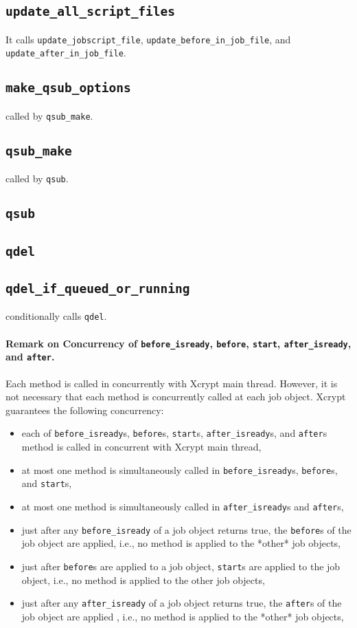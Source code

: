 \documentclass[a4paper,10pt]{report}
\def\|{\verb|} %|
\begin{document}
\subsection{\texttt{update\_all\_script\_files}}
It calls \|update_jobscript_file|, \|update_before_in_job_file|, and \|update_after_in_job_file|.
%
\subsection{\texttt{make\_qsub\_options}}
called by \|qsub_make|.
%
\subsection{\texttt{qsub\_make}}
called by \|qsub|.
%
\subsection{\texttt{qsub}}
%
\subsection{\texttt{qdel}}
\subsection{\texttt{qdel\_if\_queued\_or\_running}}
conditionally calls \|qdel|.
%

\paragraph{Remark on Concurrency of \texttt{before\_isready}, \texttt{before}, \texttt{start}, \texttt{after\_isready}, and \texttt{after}.}
Each method is called in concurrently with Xcrypt main thread.
However, it is not necessary that each method is concurrently called
at each job object.  Xcrypt guarantees the following concurrency:
\begin{itemize}
  \item each of
	\texttt{before\_isready}s, \texttt{before}s, \texttt{start}s,
	\texttt{after\_isready}s, and \texttt{after}s
       method is called in concurrent with Xcrypt main thread,
  \item
    at most one method is simultaneously called in
	\texttt{before\_isready}s, \texttt{before}s, and
	\texttt{start}s,
  \item
    at most one method is simultaneously called in
	\texttt{after\_isready}s and \texttt{after}s,
  \item
       just after any \texttt{before\_isready} of a job object returns
	true, the \texttt{before}s of the job object are applied,
	i.e., no method is applied to the *other* job objects,
  \item
       just after \texttt{before}s are applied to a job object,
	\texttt{start}s are applied to the job object, i.e., no method
	is applied to the other job objects,
  \item
       just after any \texttt{after\_isready} of a job object returns
	true, the \texttt{after}s of the job object are applied ,
	i.e., no method is applied to the *other* job objects,
\end{itemize}
\fi
\end{document}
